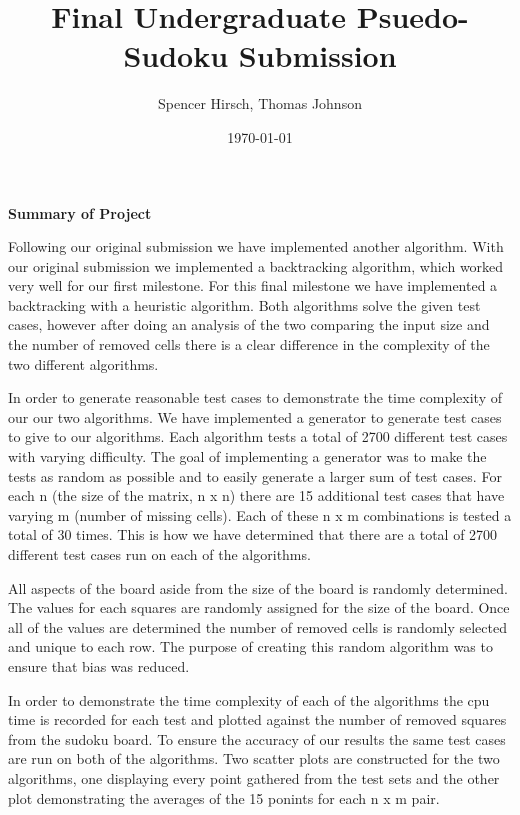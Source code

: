 \documentclass{article}
\begin{document}
\title{\textbf{Final Undergraduate Psuedo-Sudoku Submission}}
\author{Spencer Hirsch, Thomas Johnson}
\date{\today}

\maketitle

\noindent \textbf{Summary of Project}

\medskip

Following our original submission we have implemented another algorithm. With 
our original submission we implemented a backtracking algorithm, which worked
very well for our first milestone. For this final milestone we have implemented
a backtracking with a heuristic algorithm. Both algorithms solve the given
test cases, however after doing an analysis of the two comparing the input size and
the number of removed cells there is a clear difference in the complexity of the
two different algorithms. 

In order to generate reasonable test cases to demonstrate the time complexity of our
our two algorithms. We have implemented a generator to generate test cases to give to
our algorithms. Each algorithm tests a total of 2700 different test cases with varying
difficulty. The goal of implementing a generator was to make the tests as random as 
possible and to easily generate a larger sum of test cases. For each n (the size of 
the matrix, n x n) there are 15 additional test cases that have varying m (number of 
missing cells). Each of these n x m combinations is tested a total of 30 times. This 
is how we have determined that there are a total of 2700 different test cases run on
each of the algorithms. 

All aspects of the board aside from the size of the board is randomly determined. The 
values for each squares are randomly assigned for the size of the board. Once all of
the values are determined the number of removed cells is randomly selected and unique 
to each row. The purpose of creating this random algorithm was to ensure that bias was 
reduced. 

In order to demonstrate the time complexity of each of the algorithms the cpu time is
recorded for each test and plotted against the number of removed squares from the sudoku
board. To ensure the accuracy of our results the same test cases are run on both of the
algorithms. Two scatter plots are constructed for the two algorithms, one displaying every
point gathered from the test sets and the other plot demonstrating the averages of the 15
ponints for each n x m pair. 
\end{document}
